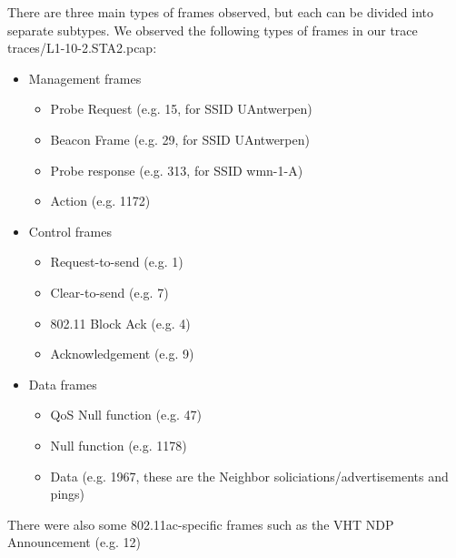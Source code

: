 There are three main types of frames observed, but each can be divided into separate subtypes.
We observed the following types of frames in our trace traces/L1-10-2.STA2.pcap:
\begin{itemize}
\item Management frames
\begin{itemize}

\item Probe Request (e.g. 15, for SSID UAntwerpen)
\item Beacon Frame (e.g. 29, for SSID UAntwerpen)

\item Probe response (e.g. 313, for SSID wmn-1-A)
\item Action (e.g. 1172)
\end{itemize}

\item Control frames
\begin{itemize}
\item Request-to-send (e.g. 1)
\item Clear-to-send (e.g. 7)
\item 802.11 Block Ack (e.g. 4)
\item Acknowledgement (e.g. 9)
\end{itemize}
\item Data frames
\begin{itemize}
\item QoS Null function (e.g. 47)
\item Null function (e.g. 1178)
\item Data (e.g. 1967, these are the Neighbor soliciations/advertisements and pings)
\end{itemize}
\end{itemize}
There were also some 802.11ac-specific frames such as the VHT NDP Announcement (e.g. 12)
